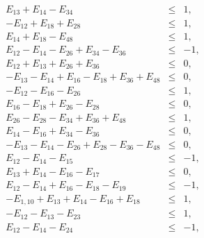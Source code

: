 \documentclass[%
  twocolumn,
 showpacs,
 showkeys,
 preprintnumbers,
 amsmath,amssymb,
 aps,
  pra,
  longbibliography,
 floatfix,
 ]{revtex4-1}
\begin{document}
\begin{eqnarray}
 E_{13} + E_{14} - E_{34} &\le&  1,                                                                          \\
-E_{12} + E_{18} + E_{28} &\le&  1,                                                                          \\
 E_{14} + E_{18} - E_{48} &\le&  1,                                                                          \\
 E_{12} - E_{14} - E_{26} + E_{34} - E_{36} &\le&  -1,                                                       \\
 E_{12} + E_{13} + E_{26} + E_{36} &\le&  0,                                                                 \\
-E_{13} - E_{14} + E_{16} - E_{18} + E_{36} + E_{48} &\le&    0,                                             \\
-E_{12} - E_{16} - E_{26} &\le&  1,                                                                          \\
E_{16} - E_{18} + E_{26} - E_{28} &\le&  0,                                                                  \\
 E_{26} - E_{28} - E_{34} + E_{36} + E_{48} &\le&  1,                                                        \\
 E_{14} - E_{16} + E_{34} - E_{36} &\le&  0,                                                                 \\
-E_{13} - E_{14} - E_{26} + E_{28} - E_{36} - E_{48} &\le&  0,                                               \\
 E_{12} - E_{14} - E_{15} &\le&  -1,                                                                         \\
 E_{13} + E_{14} - E_{16} - E_{17} &\le&  0,                                                                 \\
 E_{12} - E_{14} + E_{16} - E_{18} - E_{19} &\le&  -1,                                                       \\
-E_{1,10} + E_{13} + E_{14} - E_{16} + E_{18} &\le&    1,                                                    \\
-E_{12} - E_{13} - E_{23} &\le&  1,                                                                          \\
 E_{12} - E_{14} - E_{24} &\le&  -1,                                                                         \\

\end{eqnarray}
\end{document}
